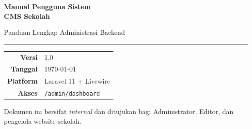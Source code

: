 \documentclass[11pt,a4paper,bahasa]{report}
\begin{document}
\sloppy

\begin{titlepage}
  \centering
  \vspace*{2cm}

  {\Huge\bfseries\color{slategray} Manual Pengguna Sistem\\[0.4em]
  \textcolor{primaryblue}{CMS Sekolah}}

  \vspace{1cm}
  {\large Panduan Lengkap Administrasi Backend}

  \vspace{0.5cm}
  \rule{0.6\textwidth}{0.4pt}

  \vspace{1.5cm}
  \begin{tabular}{rl}
    \textbf{Versi}    & 1.0 \\
    \textbf{Tanggal}  & \today \\
    \textbf{Platform} & Laravel 11 + Livewire \\
    \textbf{Akses}    & \texttt{/admin/dashboard} \\
  \end{tabular}

  \vfill
  {\small Dokumen ini bersifat \textit{internal} dan ditujukan bagi Administrator,
  Editor, dan pengelola website sekolah.}
\end{titlepage}

\tableofcontents
\clearpage






\end{document}
